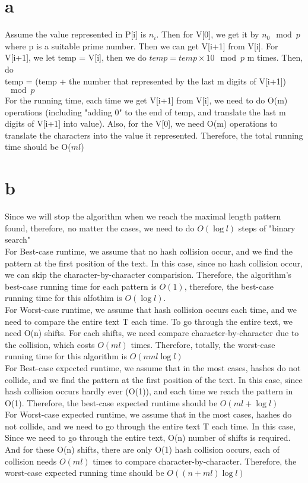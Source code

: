 \documentclass[12pt]{article}
\begin{document}
	\begin{enumerate}
		\part{a} Assume the value represented in P[i] is $n_i$. Then for V[0], we get it by $n_0 \mod p$ where p is a suitable prime number. Then we can get V[i+1] from V[i]. For V[i+1], we let temp = V[i], then we do $temp = temp \times 10 \mod p$ m times. Then, do \\
		temp = (temp + the number that represented by the last m digits of V[i+1]) $\mod p$\\
		For the running time, each time we get V[i+1] from V[i], we need to do O(m) operations (including "adding 0" to the end of temp, and translate the last m digits of V[i+1] into value). Also, for the V[0], we need O(m) operations to translate the characters into the value it represented. Therefore, the total running time should be O($ml$)
		
		\part{b} Since we will stop the algorithm when we reach the maximal length pattern found, therefore, no matter the cases, we need to do $O(\log l)$ steps of "binary search"\\
		For Best-case runtime, we assume that no hash collision occur, and we find the pattern at the first position of the text. In this case, since no hash collision occur, we can skip the character-by-character comparision. Therefore, the algorithm's best-case running time for each pattern is $O(1)$, therefore, the best-case running time for this alfothim is $O(\log l)$.\\
		For Worst-case runtime, we assume that hash collision occurs each time, and we need to compare the entire text T each time. To go through the entire text, we need O(n) shifts. For each shifts, we need compare character-by-character due to the collision, which costs $O(ml)$ times. Therefore, totally, the worst-case running time for this algorithm is $O(nml\log l)$\\
		For Best-case expected runtime, we assume that in the most cases, hashes do not collide, and we find the pattern at the first position of the text. In this case, since hash collision occurs hardly ever (O(1)), and each time we reach the pattern in O(1). Therefore, the best-case expected runtime should be $O(ml + \log l )$\\
		For Worst-case expected runtime, we assume that in the most cases, hashes do not collide, and we need to go through the entire text T each time. In this case, Since we need to go through the entire text, O(n) number of shifts is required. And for these O(n) shifts, there are only O(1) hash collision occurs, each of collision needs $O(ml)$ times to compare character-by-character. Therefore, the worst-case expected running time should be $O((n+ml)\log l)$
		

\end{enumerate}
\end{document}
